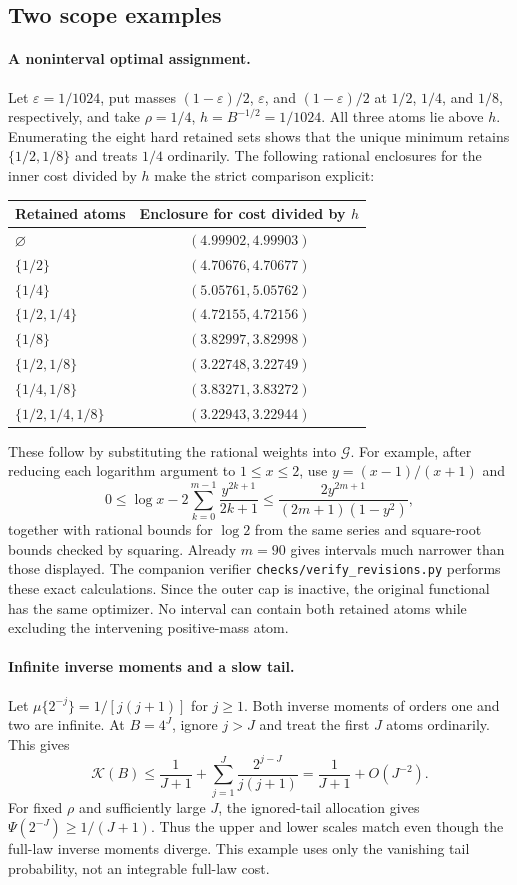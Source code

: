 \subsection{Two scope examples}

\paragraph{A noninterval optimal assignment.}
Let $\varepsilon=1/1024$, put masses $(1-\varepsilon)/2$, $\varepsilon$,
and $(1-\varepsilon)/2$ at $1/2$, $1/4$, and $1/8$, respectively, and
take $\rho=1/4$, $h=B^{-1/2}=1/1024$.
All three atoms lie above $h$. Enumerating the eight hard retained sets
shows that the unique minimum retains $\{1/2,1/8\}$ and treats $1/4$
ordinarily. The following rational enclosures for the inner cost divided
by $h$ make the strict comparison explicit:
\begin{center}
\begin{tabular}{@{}lc@{}}
\toprule
Retained atoms & Enclosure for cost divided by $h$\\
\midrule
$\varnothing$ & $(4.99902,4.99903)$\\
$\{1/2\}$ & $(4.70676,4.70677)$\\
$\{1/4\}$ & $(5.05761,5.05762)$\\
$\{1/2,1/4\}$ & $(4.72155,4.72156)$\\
$\{1/8\}$ & $(3.82997,3.82998)$\\
$\{1/2,1/8\}$ & $(3.22748,3.22749)$\\
$\{1/4,1/8\}$ & $(3.83271,3.83272)$\\
$\{1/2,1/4,1/8\}$ & $(3.22943,3.22944)$\\
\bottomrule
\end{tabular}
\end{center}
These follow by substituting the rational weights into $\mathcal G$.
For example, after reducing each logarithm argument to $1\le x\le2$,
use $y=(x-1)/(x+1)$ and
\[
 0\le\log x-2\sum_{k=0}^{m-1}\frac{y^{2k+1}}{2k+1}
 \le\frac{2y^{2m+1}}{(2m+1)(1-y^2)},
\]
together with rational bounds for $\log2$ from the same series and
square-root bounds checked by squaring. Already $m=90$ gives intervals
much narrower than those displayed. The companion verifier
\texttt{checks/verify\_revisions.py} performs these exact calculations.
Since the outer cap is inactive, the original functional has the same
optimizer. No interval can contain both retained atoms while excluding
the intervening positive-mass atom.

\paragraph{Infinite inverse moments and a slow tail.}
Let $\mu\{2^{-j}\}=1/[j(j+1)]$ for $j\ge1$. Both inverse moments
of orders one and two are infinite. At $B=4^J$, ignore $j>J$ and
treat the first $J$ atoms ordinarily. This gives
\[
 \mathcal K(B)\le\frac1{J+1}
       +\sum_{j=1}^J\frac{2^{j-J}}{j(j+1)}
       =\frac1{J+1}+O(J^{-2}).
\]
For fixed $\rho$ and sufficiently large $J$, the ignored-tail allocation
gives $\Psi(2^{-J})\ge1/(J+1)$. Thus the upper and lower scales match
even though the full-law inverse moments diverge. This example uses
only the vanishing tail probability, not an integrable full-law cost.
